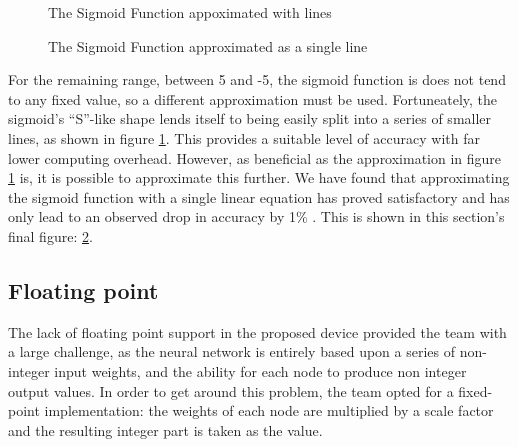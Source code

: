 \begin{figure}
\centering
{}
\caption{The Sigmoid Function appoximated with lines}
\label{fig:sigmoid_soft}
\end{figure}

\begin{figure}
\centering
{}
\caption{The Sigmoid Function approximated as a single line}
\label{fig:sigmoid_hard}
\end{figure}

For the remaining range, between 5 and -5, the sigmoid function is does not tend to any fixed value, so a different approximation must be used. Fortuneately, the sigmoid's ``S''-like shape lends itself to being easily split into a series of smaller lines, as shown in figure \ref{fig:sigmoid_soft}. This provides a suitable level of accuracy with far lower computing overhead. However, as beneficial as the approximation in figure \ref{fig:sigmoid_soft} is, it is possible to approximate this further. We have found that approximating the sigmoid function with a single
linear equation has proved satisfactory and has only lead to an observed drop in accuracy by 1\% . This is shown in this section's final figure: \ref{fig:sigmoid_hard}.

\subsection{Floating point}
The lack of floating point support in the proposed device provided the team with a large challenge, as the neural network is entirely based upon a series of non-integer input weights, and the ability for each node to produce non integer output values. In order to get around this problem, the team opted for a fixed-point implementation: the weights of each node are multiplied by a scale factor and the resulting integer part is taken as the value.

